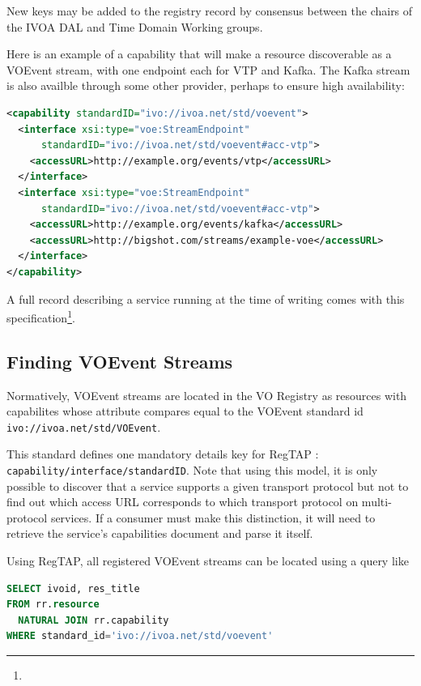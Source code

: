 \documentclass[11pt,a4paper]{ivoa}
\begin{document}
New keys may be added to the registry record by consensus between the
chairs of the IVOA DAL and Time Domain Working groups.

Here is an example of a capability that will make a resource
discoverable as a VOEvent stream, with one endpoint each for VTP and
Kafka.  The Kafka stream is also availble through some other
provider, perhaps to ensure high availability:

\begin{lstlisting}[language=XML]
<capability standardID="ivo://ivoa.net/std/voevent">
  <interface xsi:type="voe:StreamEndpoint"
      standardID="ivo://ivoa.net/std/voevent#acc-vtp">
    <accessURL>http://example.org/events/vtp</accessURL>
  </interface>
  <interface xsi:type="voe:StreamEndpoint"
      standardID="ivo://ivoa.net/std/voevent#acc-vtp">
    <accessURL>http://example.org/events/kafka</accessURL>
    <accessURL>http://bigshot.com/streams/example-voe</accessURL>
  </interface>
</capability>
\end{lstlisting}

A full record describing a service running at the time of writing
comes with this
specification\footnote{}.

\subsection{Finding VOEvent Streams}

Normatively, VOEvent streams are located in the VO Registry as resources
with capabilites whose  attribute compares equal to
the VOEvent standard id \nolinkurl{ivo://ivoa.net/std/VOEvent}.

This standard defines one mandatory details key for RegTAP
\citep{2019ivoa.spec.1011D}: \verb|capability/interface/standardID|.
Note that using this model, it is only possible to discover that a
service supports a given transport protocol but not to find out which
access URL corresponds to which transport protocol on multi-protocol
services.  If a consumer must make this distinction, it will need to
retrieve the service's capabilities document and parse it itself.

Using RegTAP, all registered VOEvent streams
can be located using a query like

\begin{lstlisting}[language=SQL]
SELECT ivoid, res_title
FROM rr.resource
  NATURAL JOIN rr.capability
WHERE standard_id='ivo://ivoa.net/std/voevent'
\end{lstlisting}
\end{document}
